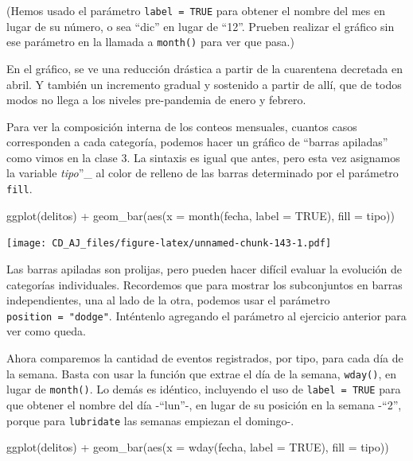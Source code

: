 \documentclass[
]{book}
\newenvironment{Shaded}{\begin{snugshade}}{\end{snugshade}}
\newcommand{\AttributeTok}[1]{\textcolor[rgb]{0.77,0.63,0.00}{#1}}
\newcommand{\ConstantTok}[1]{\textcolor[rgb]{0.00,0.00,0.00}{#1}}
\newcommand{\FunctionTok}[1]{\textcolor[rgb]{0.00,0.00,0.00}{#1}}
\newcommand{\NormalTok}[1]{#1}
\newcommand{\SpecialCharTok}[1]{\textcolor[rgb]{0.00,0.00,0.00}{#1}}
\begin{document}
(Hemos usado el parámetro \texttt{label\ =\ TRUE} para obtener el nombre del mes en lugar de su número, o sea ``dic'' en lugar de ``12''. Prueben realizar el gráfico sin ese parámetro en la llamada a \texttt{month()} para ver que pasa.)

En el gráfico, se ve una reducción drástica a partir de la cuarentena decretada en abril. Y también un incremento gradual y sostenido a partir de allí, que de todos modos no llega a los niveles pre-pandemia de enero y febrero.

Para ver la composición interna de los conteos mensuales, cuantos casos corresponden a cada categoría, podemos hacer un gráfico de ``barras apiladas'' como vimos en la clase 3. La sintaxis es igual que antes, pero esta vez asignamos la variable \emph{tipo}''\_ al color de relleno de las barras determinado por el parámetro \texttt{fill}.

\begin{Shaded}
\begin{Highlighting}[]
\FunctionTok{ggplot}\NormalTok{(delitos) }\SpecialCharTok{+} 
    \FunctionTok{geom\_bar}\NormalTok{(}\FunctionTok{aes}\NormalTok{(}\AttributeTok{x =} \FunctionTok{month}\NormalTok{(fecha, }\AttributeTok{label =} \ConstantTok{TRUE}\NormalTok{), }\AttributeTok{fill =}\NormalTok{ tipo))}
\end{Highlighting}
\end{Shaded}

\texttt{[image: CD\_AJ\_files/figure-latex/unnamed-chunk-143-1.pdf]}

Las barras apiladas son prolijas, pero pueden hacer difícil evaluar la evolución de categorías individuales. Recordemos que para mostrar los subconjuntos en barras independientes, una al lado de la otra, podemos usar el parámetro \texttt{position\ =\ "dodge"}. Inténtenlo agregando el parámetro al ejercicio anterior para ver como queda.

Ahora comparemos la cantidad de eventos registrados, por tipo, para cada día de la semana. Basta con usar la función que extrae el día de la semana, \texttt{wday()}, en lugar de \texttt{month()}. Lo demás es idéntico, incluyendo el uso de \texttt{label\ =\ TRUE} para que obtener el nombre del día -``lun''-, en lugar de su posición en la semana -``2'', porque para \texttt{lubridate} las semanas empiezan el domingo-.

\begin{Shaded}
\begin{Highlighting}[]
\FunctionTok{ggplot}\NormalTok{(delitos) }\SpecialCharTok{+} 
    \FunctionTok{geom\_bar}\NormalTok{(}\FunctionTok{aes}\NormalTok{(}\AttributeTok{x =} \FunctionTok{wday}\NormalTok{(fecha, }\AttributeTok{label =} \ConstantTok{TRUE}\NormalTok{), }\AttributeTok{fill =}\NormalTok{ tipo))}
\end{Highlighting}
\end{Shaded}
\end{document}
